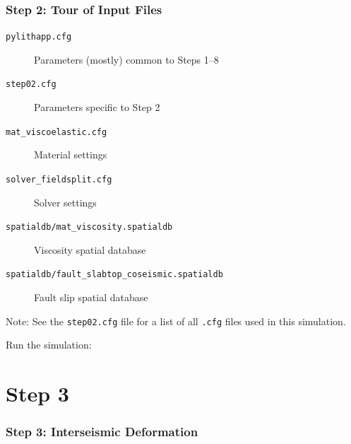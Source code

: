 \documentclass[aspectratio=169]{beamer}
\begin{document}
\begin{frame}[fragile]
  \frametitle{Step 2: Tour of Input Files}

  \begin{description}
  \item[{\tt pylithapp.cfg}] Parameters (mostly) common to Steps 1--8
  \item[{\tt step02.cfg}] Parameters specific to Step 2
  \item[{\tt mat\_viscoelastic.cfg}] Material settings
  \item[{\tt solver\_fieldsplit.cfg}] Solver settings
  \item[{\tt spatialdb/mat\_viscosity.spatialdb}] Viscosity
    spatial database
  \item[{\tt spatialdb/fault\_slabtop\_coseismic.spatialdb}] Fault
    slip spatial database
  \end{description}

  \vfill
  Note: See the {\tt step02.cfg} file for a list of all {\tt .cfg}
  files used in this simulation.
  \vfill

  Run the simulation:\\
  
\end{frame}


\section{Step 3}

\begin{frame}
  \frametitle{Step 3:  Interseismic Deformation}
  \summary{}

  
\end{frame}
\end{document}
